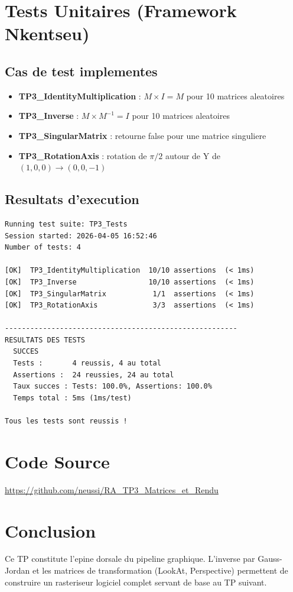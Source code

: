 \documentclass[12pt,a4paper]{article}
\begin{document}
\section{Tests Unitaires (Framework Nkentseu)}

\subsection{Cas de test implementes}

\begin{itemize}
    \item \textbf{TP3\_IdentityMultiplication} : $M \times I = M$ pour 10 matrices aleatoires
    \item \textbf{TP3\_Inverse} : $M \times M^{-1} = I$ pour 10 matrices aleatoires
    \item \textbf{TP3\_SingularMatrix} : retourne false pour une matrice singuliere
    \item \textbf{TP3\_RotationAxis} : rotation de $\pi/2$ autour de Y de $(1,0,0) \to (0,0,-1)$
\end{itemize}

\subsection{Resultats d'execution}

\begin{lstlisting}[caption=Sortie de jenga test -- TP3]
Running test suite: TP3_Tests
Session started: 2026-04-05 16:52:46
Number of tests: 4

[OK]  TP3_IdentityMultiplication  10/10 assertions  (< 1ms)
[OK]  TP3_Inverse                 10/10 assertions  (< 1ms)
[OK]  TP3_SingularMatrix           1/1  assertions  (< 1ms)
[OK]  TP3_RotationAxis             3/3  assertions  (< 1ms)

-------------------------------------------------------
RESULTATS DES TESTS
  SUCCES
  Tests :       4 reussis, 4 au total
  Assertions :  24 reussies, 24 au total
  Taux succes : Tests: 100.0%, Assertions: 100.0%
  Temps total : 5ms (1ms/test)

Tous les tests sont reussis !
\end{lstlisting}

\section{Code Source}

\begin{center}
\href{https://github.com/neussi/RA_TP3_Matrices_et_Rendu}{https://github.com/neussi/RA\_TP3\_Matrices\_et\_Rendu}
\end{center}

\section{Conclusion}

Ce TP constitute l'epine dorsale du pipeline graphique. L'inverse par Gauss-Jordan et les
matrices de transformation (LookAt, Perspective) permettent de construire un rasteriseur
logiciel complet servant de base au TP suivant.
\end{document}
